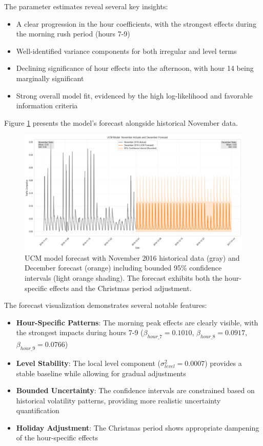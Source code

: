 \documentclass{article}
\begin{document}
The parameter estimates reveal several key insights:
\begin{itemize}
    \item A clear progression in the hour coefficients, with the strongest effects during the morning rush period (hours 7-9)
    \item Well-identified variance components for both irregular and level terms
    \item Declining significance of hour effects into the afternoon, with hour 14 being marginally significant
    \item Strong overall model fit, evidenced by the high log-likelihood and favorable information criteria
\end{itemize}

Figure \ref{fig:ucm_forecast} presents the model's forecast alongside historical November data.

\begin{figure}[htbp]
    \centering
    \includegraphics[width=\textwidth]{ucm_forecast.png}
    \caption{UCM model forecast with November 2016 historical data (gray) and December forecast (orange) including bounded 95\% confidence intervals (light orange shading). The forecast exhibits both the hour-specific effects and the Christmas period adjustment.}
    \label{fig:ucm_forecast}
\end{figure}

The forecast visualization demonstrates several notable features:

\begin{itemize}
    \item \textbf{Hour-Specific Patterns}: The morning peak effects are clearly visible, with the strongest impacts during hours 7-9 ($\beta_{hour\_7} = 0.1010$, $\beta_{hour\_8} = 0.0917$, $\beta_{hour\_9} = 0.0766$)
    
    \item \textbf{Level Stability}: The local level component ($\sigma^2_{level} = 0.0007$) provides a stable baseline while allowing for gradual adjustments
    
    \item \textbf{Bounded Uncertainty}: The confidence intervals are constrained based on historical volatility patterns, providing more realistic uncertainty quantification
    
    \item \textbf{Holiday Adjustment}: The Christmas period shows appropriate dampening of the hour-specific effects
\end{itemize}
\end{document}
